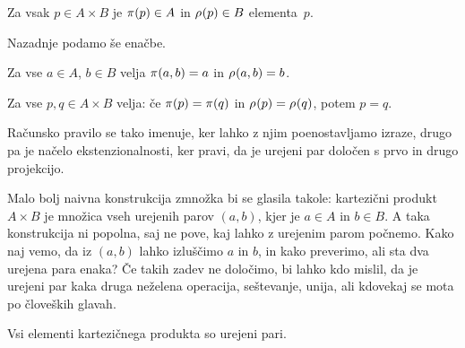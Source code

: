 \begin{pravilo}
  \label{pravilo:zmnozek-uporaba}
  Za vsak $p \in A \times B$ je $\fst(p) \in A$  in $\snd(p) \in B$
   elementa~$p$.
\end{pravilo}

Nazadnje podamo še enačbe.

\begin{pravilo}
  \label{pravilo:zmnozek-racunanje}
  Za vse $a \in A$, $b \in B$ velja $\fst(a, b) = a$ in $\snd(a, b) = b$.
\end{pravilo}

\begin{pravilo}
  \label{pravilo:zmnozek-ekstenzionalnost}
  Za vse $p, q \in A \times B$ velja: če $\fst(p) = \fst(q)$ in $\snd(p) = \snd(q)$,
  potem $p = q$.
\end{pravilo}

\noindent
%
Računsko pravilo se tako imenuje, ker lahko z njim poenostavljamo izraze, drugo pa je
načelo ekstenzionalnosti, ker pravi, da je urejeni par določen s prvo in drugo projekcijo.

Malo bolj naivna konstrukcija zmnožka bi se glasila takole: kartezični produkt
$A \times B$ je množica vseh urejenih parov $(a, b)$, kjer je $a \in A$ in $b \in B$. A
taka konstrukcija ni popolna, saj ne pove, kaj lahko z urejenim parom počnemo. Kako naj
vemo, da iz $(a, b)$ lahko izluščimo $a$ in $b$, in kako preverimo, ali sta dva urejena
para enaka? Če takih zadev ne določimo, bi lahko kdo mislil, da je urejeni par kaka druga
neželena operacija, seštevanje, unija, ali kdovekaj se mota po človeških glavah.

\begin{trditev}
  Vsi elementi kartezičnega produkta so urejeni pari.
\end{trditev}

